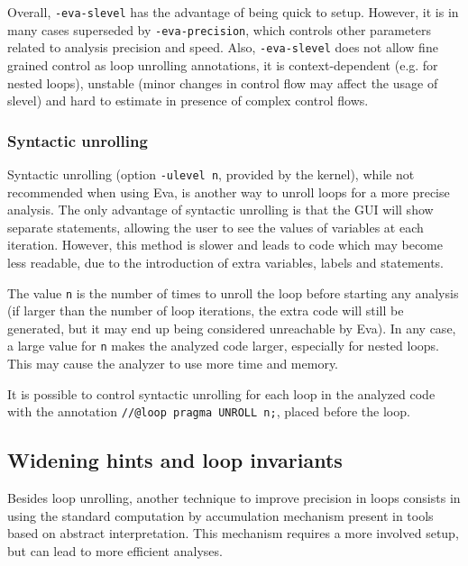 \documentclass[web]{frama-c-book}
\newcommand{\Eva}{\textsf{Eva}}
\begin{document}
Overall, \lstinline|-eva-slevel| has the advantage of being quick to setup.
However, it is in many cases superseded by \lstinline|-eva-precision|, which
controls other parameters related to analysis precision and speed.
Also, \lstinline|-eva-slevel| does not allow fine grained control as
loop unrolling annotations,
it is context-dependent (e.g. for nested loops), unstable (minor changes in
control flow may affect the usage of slevel) and hard to estimate in presence
of complex control flows.

\subsubsection{Syntactic unrolling}

Syntactic unrolling (option \lstinline|-ulevel n|, provided by the \FramaC
kernel), while not recommended when using \Eva{}, is another way to unroll
loops for a more precise analysis. The only advantage of syntactic unrolling
is that the GUI will show separate statements, allowing
the user to see the values of variables at each iteration.
However, this method is slower and leads to code which may become less
readable, due to the introduction of extra variables, labels and statements.

The value \lstinline$n$ is the number of times to unroll the loop before starting
any analysis (if larger than the number of loop iterations, the extra code will
still be generated, but it may end up being considered unreachable by \Eva{}).
In any case, a large value for \lstinline|n| makes the analyzed code larger,
especially for nested loops. This may cause the analyzer to use more time and
memory.

It is possible to control syntactic unrolling for each loop in the analyzed code
with the annotation \lstinline|//@loop pragma UNROLL n;|, placed before the loop.


\subsection{Widening hints and loop invariants}

Besides loop unrolling, another technique to improve precision in loops
consists in using the standard computation by accumulation mechanism present in
tools based on abstract interpretation. This mechanism requires a more involved
setup, but can lead to more efficient analyses.
\end{document}
